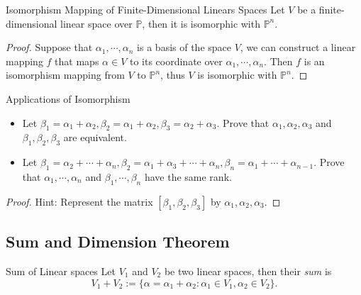\begin{theorem}{Isomorphism Mapping of Finite-Dimensional Linears Spaces}{}
  Let $V$ be a finite-dimensional linear space over $\mathbb{P}$,
  then it is isomorphic with $\mathbb{P}^n$.
\end{theorem}

\begin{proof}
  Suppose that $\alpha_1, \cdots, \alpha_n$ is a basis of the space $V$,
  we can construct a linear mapping $f$ that maps $\alpha \in V$ to
  its coordinate over $\alpha_1, \cdots, \alpha_n$.
  Then $f$ is an isomorphism mapping from $V$ to $\mathbb{P}^n$,
  thus $V$ is isomorphic with $\mathbb{P}^n$.
\end{proof}

\begin{example}{Applications of Isomorphism}{}
  \begin{itemize}
  \item Let $\beta_1 = \alpha_1 + \alpha_2, \beta_2 = \alpha_1 + \alpha_2,
    \beta_3 = \alpha_2 + \alpha_3$. Prove that $\alpha_1, \alpha_2, \alpha_3$
    and $\beta_1, \beta_2, \beta_3$ are equivalent.
  \item Let $\beta_1 = \alpha_2 + \cdots + \alpha_n,
    \beta_2 = \alpha_1 + \alpha_3 + \cdots + \alpha_n,
    \beta_n = \alpha_1 + \cdots + \alpha_{n-1}$.
    Prove that $\alpha_1, \cdots, \alpha_n$ and $\beta_1, \cdots, \beta_n$ have
    the same rank.
  \end{itemize}
\end{example}

\begin{proof}
  Hint: Represent the matrix $[\beta_1, \beta_2, \beta_3]$ by $\alpha_1, \alpha_2, \alpha_3$.
\end{proof}

\subsection{Sum and Dimension Theorem}

\begin{definition}{Sum of Linear spaces}{}
  Let $V_1$ and $V_2$ be two linear spaces, then their \emph{sum} is
  \begin{equation}
    V_1 + V_2 := \{\alpha = \alpha_1 + \alpha_2: \alpha_1 \in V_1, \alpha_2 \in V_2\}.
  \end{equation}
\end{definition}

